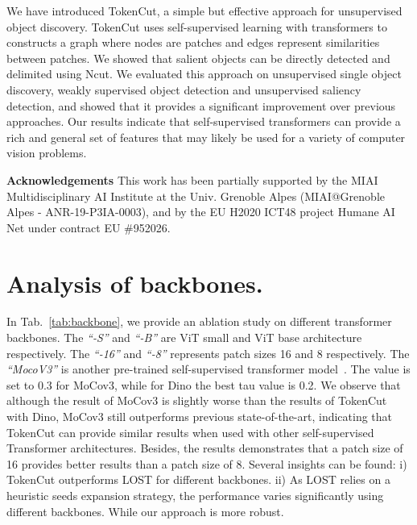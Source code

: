 \documentclass[twocolumn]{article}
\begin{document}
We have introduced TokenCut, a simple but effective approach for unsupervised object discovery. TokenCut uses self-supervised learning with transformers to constructs a graph where nodes are patches and edges represent similarities between patches. We showed that salient objects can be directly detected and delimited using Ncut. We evaluated this approach on unsupervised single object discovery, weakly supervised object detection and unsupervised saliency detection, and showed that it provides a significant improvement over previous approaches.
Our results indicate that self-supervised transformers can provide a rich and general set of features that may likely be used for a variety of computer vision problems.  

\footnotesize{\textbf{Acknowledgements} This work has been partially supported by the  MIAI  Multidisciplinary AI Institute at the Univ. Grenoble Alpes (MIAI@Grenoble Alpes - ANR-19-P3IA-0003),  and by the EU H2020 ICT48 project Humane AI Net under contract EU \#952026.}
{\small


}

\clearpage
\onecolumn
\appendix

\section{Analysis of backbones.}

In Tab.~\ref{tab:backbone}, we provide an ablation study on different transformer backbones. The \textit{``-S''} and \textit{``-B''} are ViT small\cite{dosovitskiy2020image, caron2021emerging} and ViT base\cite{dosovitskiy2020image, caron2021emerging} architecture respectively. The \textit{``-16''} and \textit{``-8''} represents patch sizes 16 and 8 respectively. The \textit{``MocoV3''} is another pre-trained self-supervised transformer model~\cite{chen2021empirical}. The  value is set to 0.3 for MoCov3, while for Dino the best tau value is 0.2. We observe that although the result of MoCov3 is slightly worse than the results of TokenCut with Dino, MoCov3 still outperforms previous state-of-the-art, indicating that TokenCut can provide similar results when used with other self-supervised Transformer architectures. Besides, the results demonstrates that a patch size of 16 provides  better results than a patch size of 8. Several insights can be found: i) TokenCut outperforms LOST for different backbones. ii) As LOST relies on a heuristic seeds expansion strategy, the performance varies significantly using different backbones. While our approach is more robust. 
\end{document}
